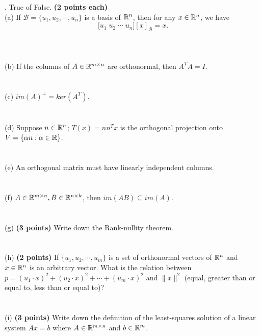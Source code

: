 \documentclass[12pt,a4paper]{article}
\newcommand{\gray}[1]{\textcolor{gray}{}}
\newcommand{\x}{\times}
\def\R{\ifmmode\mathbb R\fi}
\begin{document}
\newpage
{}. True of False. \textbf{(2 points each)}\\
(a) If $\mathcal B = \{u_1, u_2, \cdots, u_n\}$ is a basis of $\R^n$, then for any $x\in\R^n$, we have 
$$\Big[u_1 \; u_2 \; \cdots \; u_n\Big][x]_{\mathcal B} = x.$$
\gray{True}
\\
\\
\\
(b) If the columns of $A \in \R^{m\x n}$ are orthonormal, then $A^TA = I$. 
\gray{\\False. This is only true if $m\geq n$.}
\\
\\
\\
(c) $im(A)^\perp = ker(A^T)$. 
\gray{\\True}
\\
\\
\\
(d) Suppose $n \in \R^n$; $T(x) = nn^Tx$ is the orthogonal projection onto $V = \{\alpha n: \alpha \in \R\}$.
\gray{\\False. This is only true if $\|n\| = 1$.}
\\
\\
\\
(e) An orthogonal matrix must have linearly independent columns.
\gray{\\True}
\\
\\
\\
(f) $A \in \R^{m\x n}, B \in \R^{n\x k}$, then $im(AB) \subseteq im(A)$.
\gray{\\True}
\\
\\
\\
(g) \textbf{(3 points)} Write down the Rank-nullity theorem. 
\gray{\\For $n\x m$ matrix $A$, 
    $$\dim(ker(A)) + \dim(im(A)) = m$$
}
\\
\\
\\
(h) \textbf{(2 points)} If $\{u_1, u_2, \cdots, u_m\}$ is a set of orthonormal vectors of $\R^n$ and $x \in \R^n$ is an arbitrary vector. What is the relation between $p = (u_1\cdot x)^2 + (u_2 \cdot x)^2 + \cdots + (u_m\cdot x)^2$ and $\|x\|^2$ (equal, greater than or equal to, less than or equal to)? 
\gray{\\
$(u_1\cdot x)^2 + (u_2 \cdot x)^2 + \cdots + (u_m\cdot x)^2 \leq \|x\|^2$}
\\
\\
\\
(i) \textbf{(3 points)} Write down the definition of the least-squares solution of a linear system $Ax = b$ where $A\in\R^{m\x n}$ and $b\in\R^m$. 
\gray{\\$x^\ast$ is a least-squares solution to $Ax=b$ if $\|b-Ax^\ast\| \leq \|b-Ax\|$ for all $x \in \R^n$.}
\\
\\
\\
\end{document}
